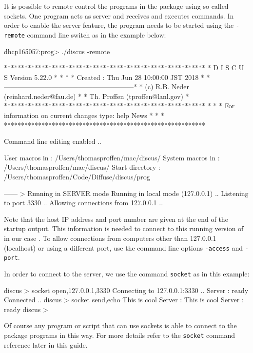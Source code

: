 It is possible to remote control the programs in the \Discus package
using so called sockets. One program acts as server and receives and 
executes commands. In order to enable the server feature, the program
needs to be started using the {\tt -remote} command line switch as in
the example below:
%
\begin{MacVerbatim}
dhcp165057:prog> ./discus -remote

          ***********************************************************
          *               D I S C U S   Version 5.22.0              *
          *                                                         *
          *         Created : Thu Jun 28 10:00:00 JST 2018          *
          *---------------------------------------------------------*
          * (c) R.B. Neder  (reinhard.neder@fau.de)                 *
          *     Th. Proffen (tproffen@lanl.gov)                     *
          ***********************************************************
          *                                                         *
          * For information on current changes type: help News      *
          *                                                         *
          ***********************************************************

 Command line editing enabled ..

 User macros in   : /Users/thomasproffen/mac/discus/
 System macros in : /Users/thomasproffen/mac/discus/
 Start directory  : /Users/thomasproffen/Code/Diffuse/discus/prog

 ------ > Running in SERVER mode
 Running in local mode (127.0.0.1) ..
 Listening to port 3330 ..
 Allowing connections from 127.0.0.1 ..
\end{MacVerbatim}
%
Note that the host IP address and port number are given at the end
of the startup output. This information is needed to connect to this 
running version of in our case \discus. To allow connections from
computers other than 127.0.0.1 (localhost) or using a different port,
use the command line options {\tt -access} and {\tt -port}.

In order to connect to the \Discus server, we use the command 
{\tt socket} as in this example:
%
\begin{MacVerbatim}
 discus > socket open,127.0.0.1,3330
 Connecting to 127.0.0.1:3330 ..
 Server : ready
 Connected ..
 discus > socket send,echo This is cool
 Server :  This is cool
 Server : ready
 discus > 
\end{MacVerbatim}
%
Of course any program or script that can use sockets is able to connect
to the \Discus package programs in this way. For more details refer
to the {\tt socket} command reference later in this guide.

